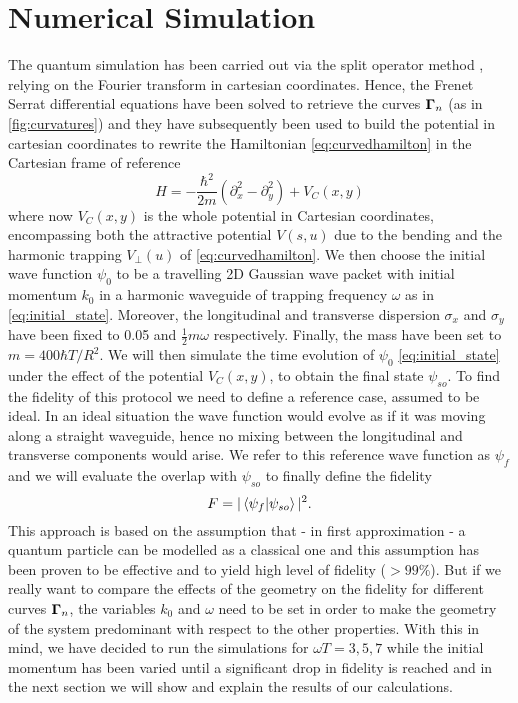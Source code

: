 \section{Numerical Simulation}
The quantum simulation has been carried out via the split operator method \cite{NoneFeit1982}, relying on the Fourier transform in cartesian coordinates.
Hence, the Frenet Serrat differential equations  have been solved to retrieve the curves $ \mathbf{\Gamma}_{n} $ (as in \cref{fig:curvatures}) and they have subsequently been used to build the potential in cartesian coordinates to rewrite the Hamiltonian \cref{eq:curvedhamilton} in the Cartesian frame of reference
\begin{equation*}
	\label{eq:splitophamilton}
	H = -\frac{\hbar^{2}}{2m}\left(\partial_{x}^{2}-\partial_{y}^{2}\right) + V_{C}(x,y)
\end{equation*}
where now $ V_{C}(x,y) $  is the whole potential in Cartesian coordinates, encompassing both the attractive potential $ V(s,u) $ due to the bending and the harmonic trapping $ V_{\perp}(u) $ of \cref{eq:curvedhamilton}.
We then choose the initial wave function $ \psi_{0} $ to be a travelling 2D Gaussian wave packet with initial momentum $ k_{0} $ in a harmonic waveguide of trapping frequency $ \omega $ as in \cref{eq:initial_state}.
Moreover, the longitudinal and transverse dispersion $ \sigma_{x} $  and $ \sigma_{y} $ have been fixed to 0.05 and $ \frac{1}{2} m\omega $ respectively.
Finally, the mass have been set to $ m = 400\hbar T/R^{2} $.
We will then simulate the time evolution of $ \psi_{0} $ \cref{eq:initial_state}  under the effect of the potential $ V_{C}(x,y) $, to obtain the final state $ \psi_{so} $.
To find the fidelity of this protocol we need to define a reference case, assumed to be ideal. 
In an ideal situation the wave function would evolve as if it was moving along a straight waveguide, hence no mixing between the longitudinal and transverse components would arise.
We refer to this reference wave function as $ \psi_{f} $ and we will evaluate the overlap with $ \psi_{so} $ to finally define the fidelity
\begin{equation}
	\label{eq:fidelity}
	F = |\braket{\psi_{f}|\psi_{so}}|^{2}.
\end{equation}
This approach is based on the assumption that - in first approximation - a quantum particle can be modelled as a classical one and this assumption has been proven to be effective and to yield high level of fidelity ($>99\%$).
But if we really want to compare the effects of the geometry on the fidelity for different curves $ \mathbf{\Gamma}_{n} $, the variables $ k_{0} $ and $ \omega $ need to be set in order to make the geometry of the system predominant with respect to the other properties.
With this in mind, we have decided to run the simulations for $ \omega T = 3,5,7 $ while the initial momentum has been varied until a significant drop in fidelity is reached and in the next section we will show and explain the results of our calculations.
